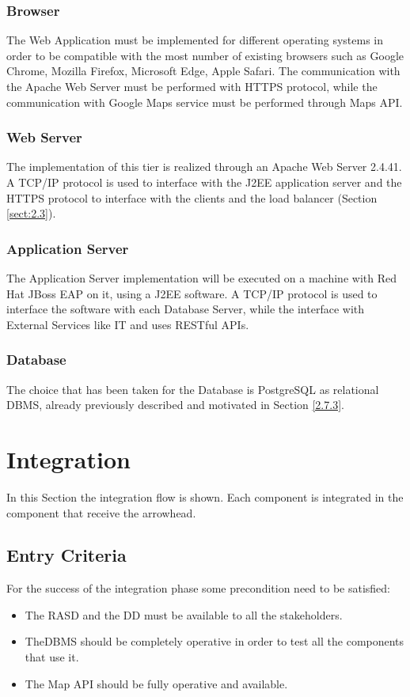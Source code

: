 \documentclass[../DD.tex]{subfiles}
\begin{document}
\subsubsection{Browser}
The Web Application must be implemented for different operating systems in order to be compatible with the most number of existing browsers such as Google Chrome, Mozilla Firefox, Microsoft Edge, Apple Safari. The communication with the Apache Web Server must be performed with HTTPS protocol, while the communication with Google Maps service must be performed through Maps API.

\subsubsection{Web Server}
The implementation of this tier is realized through an Apache Web Server 2.4.41. A TCP/IP protocol is used to interface with the J2EE application server and the HTTPS protocol to interface with the clients and the load balancer (Section \ref{sect:2.3}). 

\subsubsection{Application Server}
The Application Server implementation will be executed on a machine with Red Hat JBoss EAP on it, using a J2EE software. A TCP/IP protocol is used to interface the software with each Database Server, while the interface with External Services like  IT and  uses RESTful APIs.

\subsubsection{Database}
The choice that has been taken for the Database is PostgreSQL as relational DBMS, already previously described and motivated in Section \ref{2.7.3}.

\section{Integration\label{5.3}}

In this Section the integration flow is shown. Each component is integrated in the component that receive the arrowhead.
\subsection{Entry Criteria}
For the success of the integration phase some precondition need to be satisfied:
\begin{itemize}
	\item{The RASD and the DD must be available to all the stakeholders.}
	\item{TheDBMS should be completely operative in order to test all the components that use it.} 
	\item{The Map API should be fully operative and available.}
\end{itemize}
\end{document}
